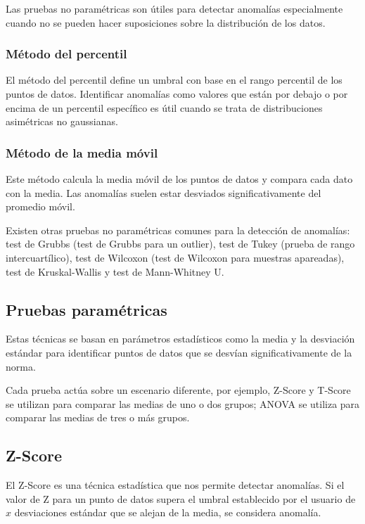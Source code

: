 Las pruebas no paramétricas son útiles para detectar anomalías especialmente cuando no se pueden hacer suposiciones sobre la distribución de los datos. 

\subsubsection{Método del percentil}

El método del percentil define un umbral con base en el rango percentil de los puntos de datos. Identificar anomalías como valores que están por debajo o por encima de un percentil específico es útil cuando se trata de distribuciones asimétricas no gaussianas.

\subsubsection{Método de la media móvil}
Este método calcula la media móvil de los puntos de datos y compara cada dato con la media. Las anomalías suelen estar desviados significativamente del promedio móvil.


Existen otras pruebas no paramétricas comunes para la detección de anomalías: test de Grubbs (test de Grubbs para un outlier), test de Tukey (prueba de rango intercuartílico), test de Wilcoxon (test de Wilcoxon para muestras apareadas), test de Kruskal-Wallis y test de Mann-Whitney U. 

\subsection{Pruebas paramétricas}

Estas técnicas se basan en parámetros estadísticos como la media y la desviación estándar para identificar puntos de datos que se desvían significativamente de la norma.

Cada prueba actúa sobre un escenario diferente, por ejemplo, Z-Score y T-Score se utilizan para comparar las medias de uno o dos grupos; ANOVA se utiliza para comparar las medias de tres o más grupos.

\subsection{Z-Score}
El Z-Score es una técnica estadística que nos permite detectar anomalías. Si el valor de Z para un punto de datos supera el umbral establecido por el usuario de $x$ desviaciones estándar que se alejan de la media, se considera anomalía.

